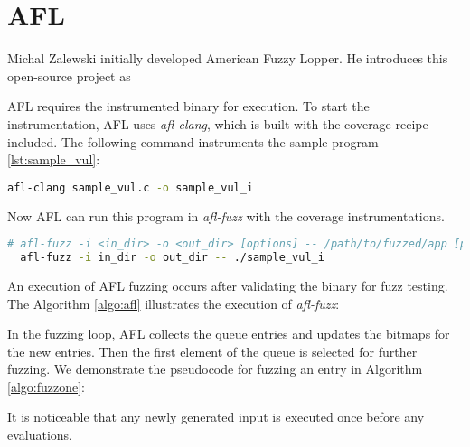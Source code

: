 \section{AFL} \label{sec:2-afl}

Michal Zalewski initially developed American Fuzzy Lopper. He introduces this open-source project as  \cite{zalewski2014american}

AFL requires the instrumented binary for execution. To start the instrumentation, AFL uses \textit{afl-clang}, which is built with the coverage recipe included. The following command instruments the sample program \ref{lst:sample_vul}:

\begin{lstlisting}[language=bash,style=CommandStyle,caption=Instrument $sample\_vul$.c]
    afl-clang sample_vul.c -o sample_vul_i
\end{lstlisting}

Now AFL can run this program in \textit{afl-fuzz} with the coverage instrumentations.

\begin{lstlisting}[language=bash,style=CommandStyle,caption=Execute AFL]
  # afl-fuzz -i <in_dir> -o <out_dir> [options] -- /path/to/fuzzed/app [params]
  afl-fuzz -i in_dir -o out_dir -- ./sample_vul_i
\end{lstlisting}

An execution of AFL fuzzing occurs after validating the binary for fuzz testing. The Algorithm \ref{algo:afl} illustrates the execution of \textit{afl-fuzz}:



In the fuzzing loop, AFL collects the queue entries and updates the bitmaps for the new entries. Then the first element of the queue is selected for further fuzzing. We demonstrate the pseudocode for fuzzing an entry in Algorithm \ref{algo:fuzzone}:



It is noticeable that any newly generated input is executed once before any evaluations.

